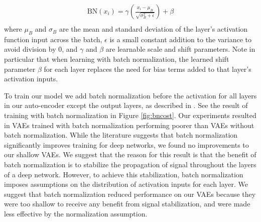 \documentclass{article} %
\numberwithin{figure}{section}
\begin{document}
\begin{align*}
    \text{BN}(x_i)=\gamma\left(\frac{x_i-\mu_B}{\sqrt{\sigma_B^2+\epsilon}}\right)+\beta\\
\end{align*} 
where $\mu_B$ and $\sigma_B$ are the mean and standard deviation of the layer's activation function input across the batch, $\epsilon$ is a small constant addition to the variance to avoid division by 0, and $\gamma$ and $\beta$ are learnable scale and shift parameters. Note in particular that when learning with batch normalization, the learned shift parameter $\beta$ for each layer replaces the need for bias terms added to that layer's activation inputs.
\par To train our model we add batch normalization before the activation for all layers in our auto-encoder except the output layers, as described in \cite{Sonderby2016}. See the result of training with batch normalization in Figure \ref{fig:bncost}. Our experiments resulted in VAEs trained with batch normalization performing poorer than VAEs without batch normalization. While the literature suggests that batch normalization significantly improves training for deep networks, we found no improvements to our shallow VAEs. We suggest that the reason for this result is that the benefit of batch normalization is to stabilize the propagation of signal throughout the layers of a deep network. However, to achieve this stabilization, batch normalization imposes assumptions on the distribution of activation inputs for each layer. We suggest that batch normalization reduced performance on our VAEs because they were too shallow to receive any benefit from signal stabilization, and were made less effective by the normalization assumption.
\end{document}
